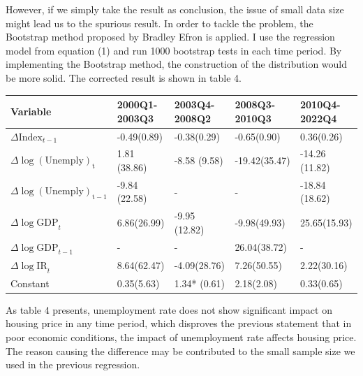 \documentclass[12pt]{article}
\begin{document}
\begin{spacing}{2}
\hspace*{0.5cm}However, if we simply take the result as conclusion, the issue of small data size might lead us to the spurious result. In order to tackle the problem, the Bootstrap method proposed by Bradley Efron is applied. I use the regression model from equation (1) and run 1000 bootstrap tests in each time period. By implementing the Bootstrap method, the construction of the distribution would be more solid. The corrected result is shown in table 4.
\begin{center}
\begin{tabular}{ |p{3.5cm}||p{2.5cm}|p{2.5cm}|p{2.5cm}| p{2.5cm}| }
 \hline
Variable & 2000Q1-2003Q3 &2003Q4-2008Q2 &2008Q3-2010Q3&2010Q4-2022Q4  \\
 \hline
 $\Delta{\mathrm{Index}_{t-1}}$  & -0.49(0.89)   &-0.38(0.29)&  -0.65(0.90)&0.36(0.26)\\
 $\Delta{\mathrm{\log(Unemply)_t}}$&  1.81 (38.86) &  -8.58 (9.58)    &-19.42(35.47)& -14.26 (11.82)      \\
 $\Delta{\mathrm{\log(Unemply)_{t-1}}}$ & -9.84 (22.58)  &- & - & -18.84  (18.62)\\
 $\Delta{\log\mathrm{GDP}}_{t}$   &6.86(26.99) &-9.95 (12.82)  &  -9.98(49.93)&  25.65(15.93)\\
$\Delta{\log\mathrm{GDP}}_{t-1}$&-& -&26.04(38.72)&-\\
$\Delta{\log\mathrm{IR}}_{t}$&  8.64(62.47)  &   -4.09(28.76)   &7.26(50.55) &2.22(30.16) \\
 Constant& 0.35(5.63)   &  1.34* (0.61)& 2.18(2.08)& 0.33(0.65)\\
 \hline
\end{tabular}
\end{center}
As table 4 presents, unemployment rate does not show significant impact on housing price in any time period, which disproves the previous statement that in poor economic conditions, the impact of unemployment rate affects housing price. The reason causing the difference may be contributed to the small sample size we used in the previous regression.
\newpage


\newpage

\end{spacing}
\end{document}
